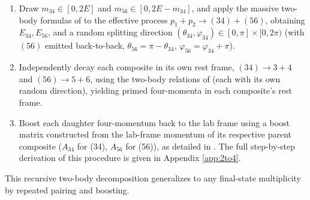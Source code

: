 \documentclass{article}
\begin{document}
\begin{enumerate}
    \item Draw $m_{34} \in [0,2E]$ and $m_{56} \in [0,2E-m_{34}]$, and apply the massive two-body formulas of  to the effective process  $p_1 + p_2 \rightarrow (34)+(56)$, obtaining $E_{34},E_{56}$, and a random splitting direction $(\theta_{34}, \varphi_{34}) \in [0,\pi]\times[0,2\pi)$ (with $(56)$ emitted back-to-back, $\theta_{56} = \pi - \theta_{34}$, $\varphi_{56} = \varphi_{34} + \pi$).
    \item Independently decay each composite in its own rest frame, $(34) \rightarrow 3+4$ and $(56) \rightarrow 5+6$, using the two-body relations of  (each with its own random direction), yielding primed four-momenta in each composite's rest frame.
    \item Boost each daughter four-momentum back to the lab frame using a boost matrix constructed from the lab-frame momentum of its respective parent composite ($A_{34}$ for (34), $A_{56}$ for (56)), as detailed in . The full step-by-step derivation of this procedure is given in Appendix \ref{app:2to4}.
\end{enumerate}
This recursive two-body decomposition generalizes to any final-state multiplicity by repeated pairing and boosting.
\end{document}
